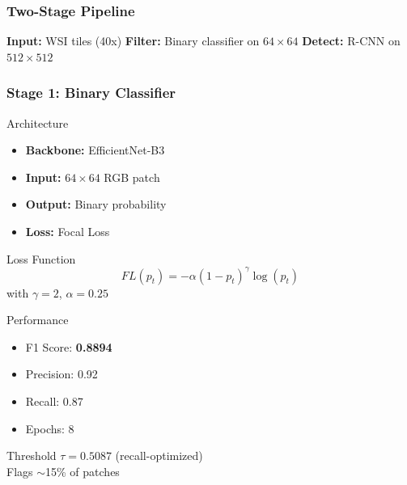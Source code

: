 \documentclass[aspectratio=169,13pt]{beamer}
\begin{document}
\begin{frame}
  \frametitle{Two-Stage Pipeline}
  \centering
  
  \vspace{1cm}
            \small \textbf{Input:} WSI tiles (40x)
          \small \textbf{Filter:} Binary classifier on $64 \times 64$
          \small \textbf{Detect:} R-CNN on $512 \times 512$
  
\end{frame}

\begin{frame}
  \frametitle{Stage 1: Binary Classifier}
            \begin{block}{Architecture}
        \begin{itemize}
          \item \textbf{Backbone:} EfficientNet-B3
          \item \textbf{Input:} $64 \times 64$ RGB patch
          \item \textbf{Output:} Binary probability
          \item \textbf{Loss:} Focal Loss
        \end{itemize}
      \end{block}
      \begin{block}{Loss Function}
        $$FL(p_t) = -\alpha(1-p_t)^{\gamma}\log(p_t)$$
        with $\gamma = 2$, $\alpha = 0.25$
      \end{block}
    
          \begin{block}{Performance}
        \begin{itemize}
          \item F1 Score: \textbf{0.8894}
          \item Precision: 0.92
          \item Recall: 0.87
          \item Epochs: 8
        \end{itemize}
      \end{block}
      \begin{block}{Threshold}
        $\tau = 0.5087$ (recall-optimized)
        \\ Flags $\sim$15\% of patches
      \end{block}
  
\end{frame}
\end{document}
